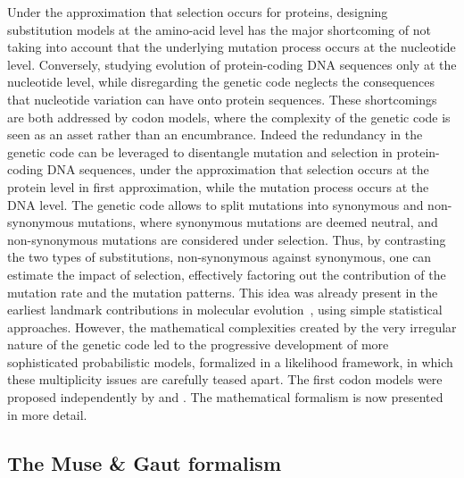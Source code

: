 Under the approximation that selection occurs for proteins, designing substitution models at the amino-acid level has the major shortcoming of not taking into account that the underlying mutation process occurs at the nucleotide level.
Conversely, studying evolution of protein-coding \acrshort{DNA} sequences only at the nucleotide level, while disregarding the genetic code neglects the consequences that nucleotide variation can have onto protein sequences.
These shortcomings are both addressed by codon models, where the complexity of the genetic code is seen as an asset rather than an encumbrance.
Indeed the redundancy in the genetic code can be leveraged to disentangle mutation and selection in protein-coding \acrshort{DNA} sequences, under the approximation that selection occurs at the protein level in first approximation, while the mutation process occurs at the \acrshort{DNA} level.
The genetic code allows to split mutations into synonymous and non-synonymous mutations, where synonymous mutations are deemed neutral, and non-synonymous mutations are considered under selection.
Thus, by contrasting the two types of substitutions, non-synonymous against synonymous, one can estimate the impact of selection, effectively factoring out the contribution of the mutation rate and the mutation patterns.
This idea was already present in the earliest landmark contributions in molecular evolution~\citep{Kimura1968,King1969}, using simple statistical approaches.
However, the mathematical complexities created by the very irregular nature of the genetic code led to the progressive development of more sophisticated probabilistic models, formalized in a likelihood framework, in which these multiplicity issues are carefully teased apart.
The first codon models were proposed independently by \citet{Muse1994} and \citet{Goldman1994}.
The mathematical formalism is now presented in more detail.

\subsection{The Muse \& Gaut formalism}
\label{subsec:MG-formalism}

